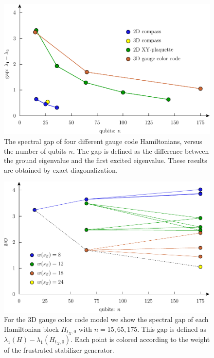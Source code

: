 \documentclass[11pt,oneside]{article}
\begin{document}
\begin{figure}
\begin{center}
\includegraphics[width=0.8\columnwidth]{pic-gap.pdf}
\caption{%
The spectral gap of four different gauge code Hamiltonians, versus the number
of qubits $n$. The gap is defined as the difference between
the ground eigenvalue and the first excited eigenvalue.
These results are obtained by exact diagonalization.
}
\label{PicGap}
\end{center}
\end{figure}

\begin{figure}
\begin{center}
\includegraphics[width=0.8\columnwidth]{pic-gap-stabs.pdf}
\caption{%
For the 3D gauge color code model
we show the spectral gap
of each Hamiltonian block $H_{t_X,0}$
with $n=15,65,175.$
This gap is defined as $\lambda_1(H) - \lambda_1(H_{t_X,0}).$
Each point is colored according to the weight of the
frustrated stabilizer generator.
}
\label{PicGapStabs}
\end{center}
\end{figure}
\end{document}
